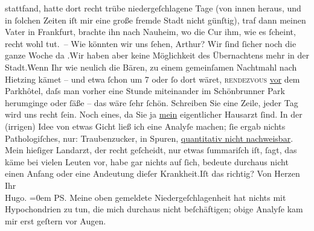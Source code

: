 \begin{ledgroupsized}[t]{13cm}
{{{                  stattfand}}}\label{K_L02182-2h}, hatte dort recht trübe niedergeſchlagene Tage (von innen heraus,
               und in ſolchen Zeiten iſt mir eine große fremde Stadt nicht günſtig), traf dann
               meinen Vater in Frankfurt, brachte ihn nach Nauheim, wo die Cur ihm, wie es ſcheint, recht wohl tut. – Wie
                  {\pb}könnten wir uns ſehen, Arthur?
               Wir ſind ſicher noch die ganze Woche da \label{K_L02182-3v}\label{K_L02182-3h}.\hspace*{1.5em}Wir haben aber keine Möglichkeit des Übernachtens mehr
               in der Stadt.\hspace*{1.5em}Wenn Ihr wie neulich die Bären, zu einem gemeinſamen Nachtmahl
               nach Hietzing kämet – und etwa ſchon um
                  7 oder ſo dort wäret, \textsc{rendezvous}{ }\uline{vor} dem Parkhôtel, daſs man {\pb}vorher
               eine Stunde miteinander im Schönbrunner Park
               herumginge oder ſäße – das wäre ſehr ſchön. Schreiben Sie eine Zeile, jeder Tag wird
               uns recht ſein.\pend
           \pstart
           Noch eines, da Sie ja \uline{mein} eigentlicher Hausarzt
               ſind. In der (irrigen) Idee von etwas Gicht ließ ich eine Analyſe machen; ſie ergab
               nichts Pathologiſches, nur: Traubenzucker,  in
               Spuren, {\pb}\uline{quantitativ nicht nachweisbar}. Mein hieſiger Landarzt, der recht
               geſcheidt, nur etwas ſummariſch iſt, ſagt, das käme bei vielen Leuten vor, habe gar
               nichts auf ſich, bedeute durchaus nicht einen Anfang oder eine Andeutung dieſer
                  Krankheit.\hspace*{1.5em}Iſt das richtig?\pend
           \pstart
           Von Herzen Ihr{\\[\baselineskip]}\spacefill\mbox{Hugo.}\pend
           \leftskip=0em{}\pstart
           \noindent{}\textsc{PS}. Meine oben gemeldete Niedergeſchlagenheit hat nichts
                  mit Hypochondrien zu tun, die mich durchaus nicht beſchäftigen; obige Analyſe kam
                  mir erst geſtern vor Augen.\pend
           

\end{ledgroupsized}
